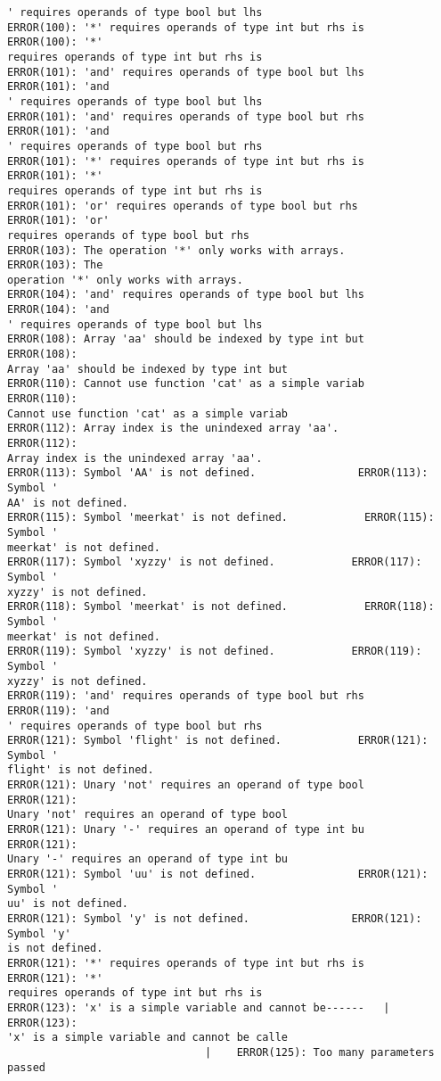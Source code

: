 \documentclass[12pt]{book}
\begin{document}
\begin{lstlisting}
' requires operands of type bool but lhs
ERROR(100): '*' requires operands of type int but rhs is    ERROR(100): '*' 
requires operands of type int but rhs is
ERROR(101): 'and' requires operands of type bool but lhs    ERROR(101): 'and
' requires operands of type bool but lhs
ERROR(101): 'and' requires operands of type bool but rhs    ERROR(101): 'and
' requires operands of type bool but rhs
ERROR(101): '*' requires operands of type int but rhs is    ERROR(101): '*' 
requires operands of type int but rhs is
ERROR(101): 'or' requires operands of type bool but rhs     ERROR(101): 'or'
requires operands of type bool but rhs 
ERROR(103): The operation '*' only works with arrays.        ERROR(103): The
operation '*' only works with arrays.
ERROR(104): 'and' requires operands of type bool but lhs    ERROR(104): 'and
' requires operands of type bool but lhs
ERROR(108): Array 'aa' should be indexed by type int but    ERROR(108): 
Array 'aa' should be indexed by type int but
ERROR(110): Cannot use function 'cat' as a simple variab    ERROR(110): 
Cannot use function 'cat' as a simple variab
ERROR(112): Array index is the unindexed array 'aa'.        ERROR(112): 
Array index is the unindexed array 'aa'.
ERROR(113): Symbol 'AA' is not defined.                ERROR(113): Symbol '
AA' is not defined.
ERROR(115): Symbol 'meerkat' is not defined.            ERROR(115): Symbol '
meerkat' is not defined.
ERROR(117): Symbol 'xyzzy' is not defined.            ERROR(117): Symbol '
xyzzy' is not defined.
ERROR(118): Symbol 'meerkat' is not defined.            ERROR(118): Symbol '
meerkat' is not defined.
ERROR(119): Symbol 'xyzzy' is not defined.            ERROR(119): Symbol '
xyzzy' is not defined.
ERROR(119): 'and' requires operands of type bool but rhs    ERROR(119): 'and
' requires operands of type bool but rhs
ERROR(121): Symbol 'flight' is not defined.            ERROR(121): Symbol '
flight' is not defined.
ERROR(121): Unary 'not' requires an operand of type bool    ERROR(121): 
Unary 'not' requires an operand of type bool
ERROR(121): Unary '-' requires an operand of type int bu    ERROR(121): 
Unary '-' requires an operand of type int bu
ERROR(121): Symbol 'uu' is not defined.                ERROR(121): Symbol '
uu' is not defined.
ERROR(121): Symbol 'y' is not defined.                ERROR(121): Symbol 'y'
is not defined.
ERROR(121): '*' requires operands of type int but rhs is    ERROR(121): '*' 
requires operands of type int but rhs is
ERROR(123): 'x' is a simple variable and cannot be------   |    ERROR(123): 
'x' is a simple variable and cannot be calle
                               |    ERROR(125): Too many parameters passed 

\end{lstlisting}
\end{document}
